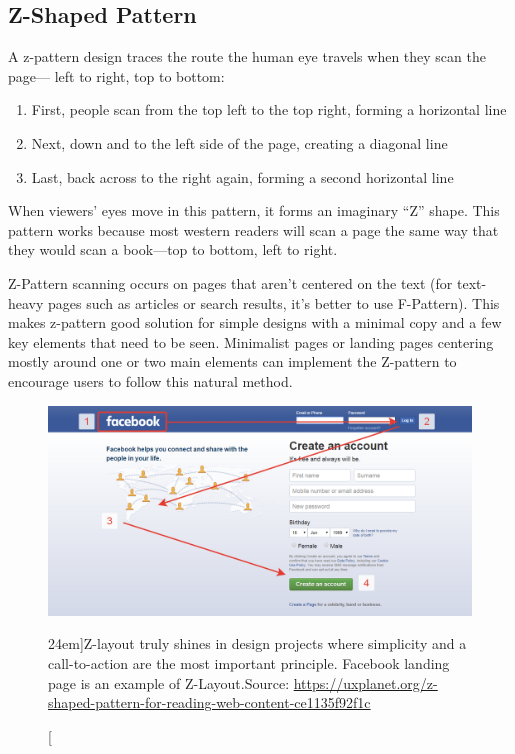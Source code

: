 \subsection{Z-Shaped Pattern} %
\label{sub:z_shaped_pattern}

A z-pattern design traces the route the human eye travels when they scan the page— left to right, top to bottom:
\begin{enumerate}
	\item First, people scan from the top left to the top right, forming a horizontal line
	\item Next, down and to the left side of the page, creating a diagonal line
	\item Last, back across to the right again, forming a second horizontal line
\end{enumerate}
When viewers’ eyes move in this pattern, it forms an imaginary ``Z'' shape.
This pattern works because most western readers will scan a page the same way that they would scan a book---top to bottom, left to right.

Z-Pattern scanning occurs on pages that aren’t centered on the text (for text-heavy pages such as articles or search results, it’s better to use F-Pattern). This makes z-pattern good solution for simple designs with a minimal copy and a few key elements that need to be seen. Minimalist pages or landing pages centering mostly around one or two main elements can implement the Z-pattern to encourage users to follow this natural method.

\begin{figure}%
	\centering
  \includegraphics[width=1.55\textwidth]{../figures/z-shape_facebook.png}
  \caption[][24em]{Z-layout truly shines in design projects where simplicity and a call-to-action are the most important principle. Facebook landing page is an example of Z-Layout.\newline Source: \url{https://uxplanet.org/z-shaped-pattern-for-reading-web-content-ce1135f92f1c}}
  \label{fig:z-shape_facebook}
\end{figure}

